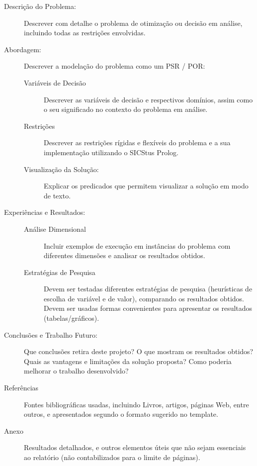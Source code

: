 \documentclass[11pt]{article}
\begin{document}
\begin{description}

\item[Descrição do Problema:] Descrever com detalhe o problema de
otimização ou decisão em análise, incluindo todas as restrições envolvidas.

\item[Abordagem:] Descrever a modelação do problema como um PSR / POR:

\begin{description}

\item[Variáveis de Decisão] Descrever as variáveis de decisão e
respectivos domínios, assim como o seu significado no contexto do problema em análise.

\item[Restrições] Descrever as restrições rígidas e flexíveis do problema e a
sua implementação utilizando o SICStus Prolog.

\item[Visualização da Solução:] Explicar os predicados que permitem
visualizar a solução em modo de texto.

\end{description}


\item[Experiências e Resultados:]

\begin{description}

\item[Análise Dimensional] Incluir exemplos de execução em instâncias do problema com
diferentes dimensões e analisar os resultados obtidos.

\item[Estratégias de Pesquisa] Devem ser testadas diferentes estratégias de pesquisa
(heurísticas de escolha de variável e de valor), comparando os resultados obtidos.
Devem ser usadas formas convenientes para apresentar os resultados (tabelas/gráficos).

\end{description}


\item[Conclusões e Trabalho Futuro:] Que conclusões retira
deste projeto? O que mostram os resultados obtidos? Quais as vantagens e limitações da
solução proposta? Como poderia melhorar o trabalho desenvolvido?

\item[Referências] Fontes bibliográficas usadas, incluindo Livros, artigos, páginas
Web, entre outros, e apresentados segundo o formato sugerido no template.

\item[Anexo] Resultados detalhados, e outros elementos úteis que não sejam essenciais
ao relatório (não contabilizados para o limite de páginas).

\end{description}
\end{document}
